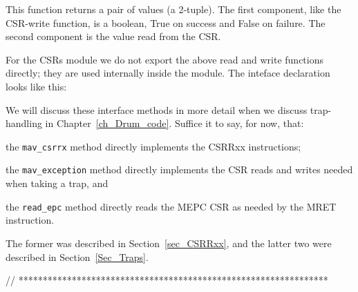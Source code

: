 

This function returns a pair of values (a 2-tuple).  The first
component, like the CSR-write function, is a boolean, True on success
and False on failure.  The second component is the value read from the
CSR.

For the CSRs module we do not export the above read and write
functions directly; they are used internally inside the module.  The
inteface declaration looks like this:



We will discuss these interface methods in more detail when we discuss
trap-handling in Chapter~\ref{ch_Drum_code}.  Suffice it to say, for
now, that:

\begin{tightlist}

 \item the \verb|mav_csrrx| method directly implements the CSRRxx instructions;

 \item the \verb|mav_exception| method directly implements the CSR
       reads and writes needed when taking a trap, and

 \item the \verb|read_epc| method directly reads the MEPC CSR as
       needed by the MRET instruction.

\end{tightlist}
The former was described in Section~\ref{sec_CSRRxx}, and the latter
two were described in Section~\ref{Sec_Traps}.

// ****************************************************************
